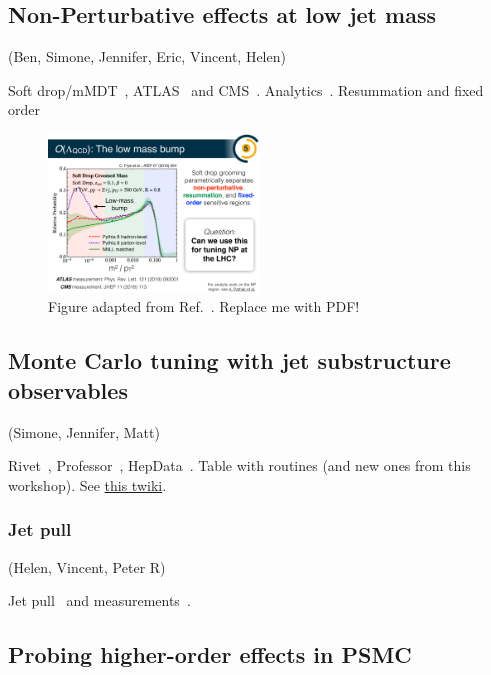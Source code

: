 \documentclass[11pt]{cernrep}
\begin{document}
\subsection{Non-Perturbative effects at low jet mass}
\label{sec:jets:np}
(Ben, Simone, Jennifer, Eric, Vincent, Helen)

Soft drop/mMDT~\cite{Larkoski:2014wba,Dasgupta:2013ihk}, ATLAS~\cite{Aaboud:2017qwh,Aad:2019vyi} and CMS~\cite{Sirunyan:2018xdh}.  Analytics~\cite{Hoang:2019ceu}.  Resummation and fixed order~\cite{Frye:2016aiz,Frye:2016okc,Marzani:2017mva,Marzani:2017kqd,Kang:2018vgn,Kang:2018jwa,Baron:2018nfz,Kardos:2018kth}

\begin{figure}[h!]
\centering
\includegraphics[width=0.5\textwidth]{figs/Lowmassbump.pdf}
\caption{Figure adapted from Ref.~\cite{Frye:2016aiz}.  Replace me with PDF!}
\label{fig:jets:np:illustration}
\end{figure}

\subsection{Monte Carlo tuning with jet substructure observables}
\label{sec:jets:mc}
(Simone, Jennifer, Matt)

Rivet~\cite{Buckley:2010ar}, Professor~\cite{Buckley:2009bj}, HepData~\cite{Buckley:2010jn,Maguire:2017ypu}.  Table with routines (and new ones from this workshop).  See \href{https://twiki.cern.ch/twiki/bin/view/LHCPhysics/LHCJetSubstructureMeasurements}{this twiki}.

\subsubsection{Jet pull}
\label{sec:jets:pull}
(Helen, Vincent, Peter R)

Jet pull~\cite{Gallicchio:2010sw} and measurements~\cite{Aad:2015lxa,Aaboud:2018ibj}.

\subsection{Probing higher-order effects in PSMC}
\label{sec:jets:psmc}
\end{document}
